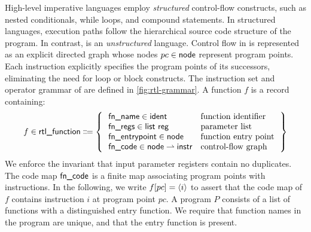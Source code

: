 \documentclass[report.tex]{subfiles}
\begin{document}
High-level imperative languages employ \emph{structured} control-flow constructs,
such as nested conditionals,
while loops,
and compound statements.
In structured languages,
execution paths follow the hierarchical source code structure of the program.
In contrast,
\muRTL{} is an \emph{unstructured} language.
Control flow in \muRTL{} is represented as an explicit directed graph whose nodes
$pc \in \textsf{node}$ represent program points.
Each instruction explicitly specifies the program points of its successors,
eliminating the need for loop or block constructs.
The instruction set and operator grammar of \muRTL{} are defined in
\cref{fig:rtl-grammar}.
A \muRTL{} function $f$ is a record containing:
\begin{equation*}
  f \in \rtlfun \Coloneqq \left\{\,
  \begin{array}{l@{\quad}l}
    \fnname \in \ident
    & \text{function identifier} \\
    \fnregs \in \listT{\reg}
    & \text{parameter list} \\
    \fnentry \in \node
    & \text{function entry point} \\
    \fncode \in \node \rightharpoonup \instr
    & \text{control-flow graph}
  \end{array}
  \,\right\}
\end{equation*}
We enforce the invariant that input parameter registers contain no duplicates.
The code map $\textsf{fn\_code}$ is a finite map associating program points
with instructions.
In the following,
we write $f[pc] = \langle i\rangle$ to assert that the code map of $f$ contains
instruction $i$ at program point $pc$.
A \muRTL{} program $P$ consists of a list of functions with a distinguished
entry function.
We require that function names in the program are unique,
and that the entry function is present.
\end{document}
